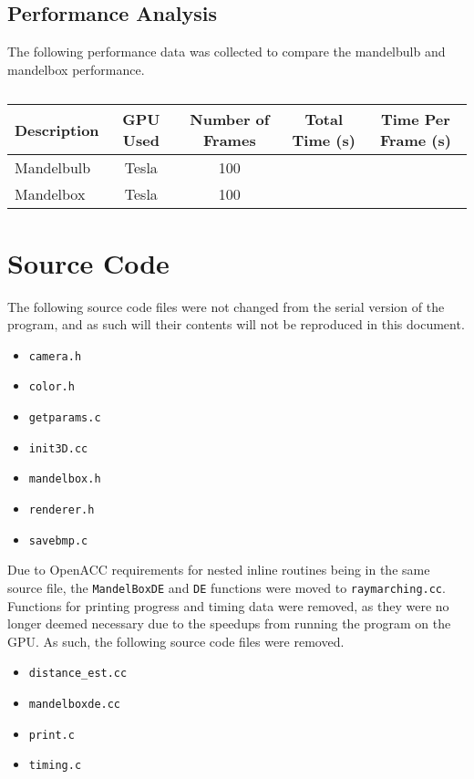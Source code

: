 \documentclass[11pt]{article}
\begin{document}
\subsection{Performance Analysis}
The following performance data was collected to compare the mandelbulb and mandelbox performance.
\begin{table}[h]
\centering
\caption{}
\begin{tabular}{lcccc}
\toprule
Description & GPU Used & Number of Frames & Total Time (s) & Time Per Frame (s)\\\midrule
Mandelbulb & Tesla & 100 & & \\
Mandelbox & Tesla & 100 & & \\
\bottomrule
\end{tabular}
\end{table}

\section{Source Code}
The following source code files were not changed from the serial version of the program, and as such will their contents will not be reproduced in this document.
\begin{itemize}
\item \texttt{camera.h}
\item \texttt{color.h}
\item \texttt{getparams.c}
\item \texttt{init3D.cc}
\item \texttt{mandelbox.h}
\item \texttt{renderer.h}
\item \texttt{savebmp.c}
\end{itemize}

Due to OpenACC requirements for nested inline routines being in the same source file, the \texttt{MandelBoxDE} and \texttt{DE} functions were moved to \texttt{raymarching.cc}. Functions for printing progress and timing data were removed, as they were no longer deemed necessary due to the speedups from running the program on the GPU. As such, the following source code files were removed.
\begin{itemize}
\item \texttt{distance\_est.cc}
\item \texttt{mandelboxde.cc}
\item \texttt{print.c}
\item \texttt{timing.c}
\end{itemize}
\end{document}
